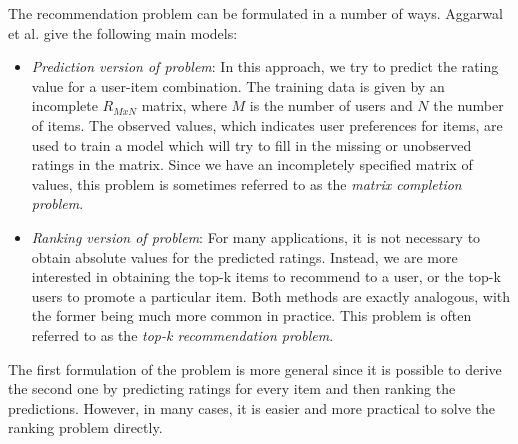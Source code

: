 \documentclass[cic,tc,english]{iiufrgs}
\begin{document}
The recommendation problem can be formulated in a number of ways. Aggarwal et al. \cite{Aggarwal2016} give the following main models:
\begin{itemize}
\item \emph{Prediction version of problem}: In this approach, we try to predict the rating value for a user-item combination. The training data is given by an incomplete $R_{MxN}$ matrix, where $M$ is the number of users and $N$ the number of items. The observed values, which indicates user preferences for items, are used to train a model which will try to fill in the missing or unobserved ratings in the matrix. Since we have an incompletely specified matrix of values, this problem is sometimes referred to as the \textit{matrix completion problem}.
\item \emph{Ranking version of problem}: For many applications, it is not necessary to obtain absolute values for the predicted ratings. Instead, we are more interested in obtaining the top-k items to recommend to a user, or the top-k users to promote a particular item. Both methods are exactly analogous, with the former being much more common in practice. This problem is often referred to as the \textit{top-k recommendation problem}.
\end{itemize}

The first formulation of the problem is more general since it is possible to derive the second one by predicting ratings for every item and then ranking the predictions. However, in many cases, it is easier and more practical to solve the ranking problem directly.
\end{document}
